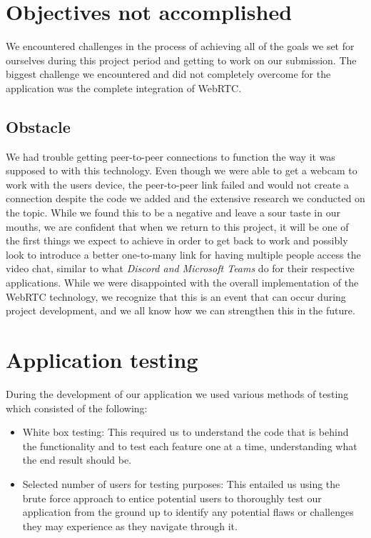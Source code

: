 \section{Objectives not accomplished}

We encountered challenges in the process of achieving all of the goals we set for ourselves during this project period and getting to work on our submission. The biggest challenge we encountered and did not completely overcome for the application was the complete integration of WebRTC.

\subsection{Obstacle}

We had trouble getting peer-to-peer connections to function the way it was supposed to with this technology. Even though we were able to get a webcam to work with the users device, the peer-to-peer link failed and would not create a connection despite the code we added and the extensive research we conducted on the topic. While we found this to be a negative and leave a sour taste in our mouths, we are confident that when we return to this project, it will be one of the first things we expect to achieve in order to get back to work and possibly look to introduce a better one-to-many link for having multiple people access the video chat, similar to what \textit{Discord \cite{ref6} and Microsoft Teams\cite{ref7} } do for their respective applications.
While we were disappointed with the overall implementation of the WebRTC technology, we recognize that this is an event that can occur during project development, and we all know how we can strengthen this in the future.


\section{Application testing}

During the development of our application we used various methods of testing which consisted of the following:


\begin{itemize}
  \item White box testing: \hfill \break
  This required us to understand the code that is behind the functionality and to test each feature one at a time, understanding what the end result should be.
  \item Selected number of users for testing purposes: \hfill \break
  This entailed us using the brute force approach to entice potential users to thoroughly test our application from the ground up to identify any potential flaws or challenges they may experience as they navigate through it.
\end{itemize}

